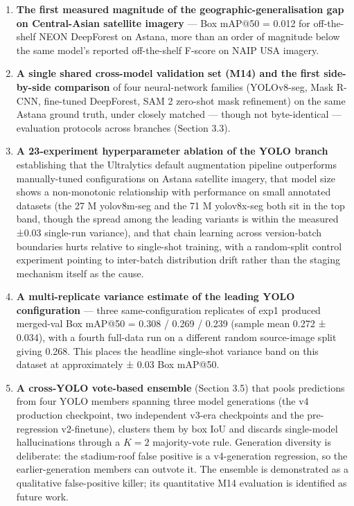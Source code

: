 \begin{enumerate}
\def\labelenumi{\arabic{enumi}.}
\item
  \textbf{The first measured magnitude of the geographic-generalisation gap on Central-Asian satellite imagery} --- Box mAP@50 = 0.012 for off-the-shelf NEON DeepForest on Astana, more than an order of magnitude below the same model's reported off-the-shelf F-score on NAIP USA imagery.
\item
  \textbf{A single shared cross-model validation set (M14) and the first side-by-side comparison} of four neural-network families (YOLOv8-seg, Mask R-CNN, fine-tuned DeepForest, SAM 2 zero-shot mask refinement) on the same Astana ground truth, under closely matched --- though not byte-identical --- evaluation protocols across branches (Section 3.3).
\item
  \textbf{A 23-experiment hyperparameter ablation of the YOLO branch} establishing that the Ultralytics default augmentation pipeline outperforms manually-tuned configurations on Astana satellite imagery, that model size shows a non-monotonic relationship with performance on small annotated datasets (the 27 M yolov8m-seg and the 71 M yolov8x-seg both sit in the top band, though the spread among the leading variants is within the measured ±0.03 single-run variance), and that chain learning across version-batch boundaries hurts relative to single-shot training, with a random-split control experiment pointing to inter-batch distribution drift rather than the staging mechanism itself as the cause.
\item
  \textbf{A multi-replicate variance estimate of the leading YOLO configuration} --- three same-configuration replicates of exp1 produced merged-val Box mAP@50 = 0.308 / 0.269 / 0.239 (sample mean 0.272 ± 0.034), with a fourth full-data run on a different random source-image split giving 0.268. This places the headline single-shot variance band on this dataset at approximately ± 0.03 Box mAP@50.
\item
  \textbf{A cross-YOLO vote-based ensemble} (Section 3.5) that pools predictions from four YOLO members spanning three model generations (the v4 production checkpoint, two independent v3-era checkpoints and the pre-regression v2-finetune), clusters them by box IoU and discards single-model hallucinations through a \(K = 2\) majority-vote rule. Generation diversity is deliberate: the stadium-roof false positive is a v4-generation regression, so the earlier-generation members can outvote it. The ensemble is demonstrated as a qualitative false-positive killer; its quantitative M14 evaluation is identified as future work.

\end{enumerate}
